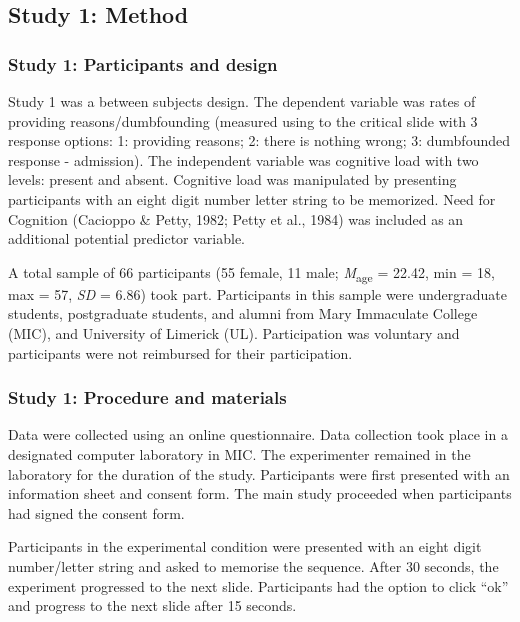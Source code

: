 \documentclass[
  american,
  man,floatsintext]{apa7}
\begin{document}
\hypertarget{study-1-method}{%
\subsection{Study 1: Method}\label{study-1-method}}

\hypertarget{study-1-participants-and-design}{%
\subsubsection{Study 1: Participants and design}\label{study-1-participants-and-design}}

Study 1 was a between subjects design. The dependent variable was rates of providing reasons/dumbfounding (measured using to the critical slide with 3 response options: 1: providing reasons; 2: there is nothing wrong; 3: dumbfounded response - admission). The independent variable was cognitive load with two levels: present and absent. Cognitive load was manipulated by presenting participants with an eight digit number letter string to be memorized. Need for Cognition (Cacioppo \& Petty, 1982; Petty et al., 1984) was included as an additional potential predictor variable.

A total sample of 66 participants (55 female, 11 male; \emph{M}\textsubscript{age} = 22.42, min = 18, max = 57, \emph{SD} = 6.86) took part. Participants in this sample were undergraduate students, postgraduate students, and alumni from Mary Immaculate College (MIC), and University of Limerick (UL). Participation was voluntary and participants were not reimbursed for their participation.

\hypertarget{study-1-procedure-and-materials}{%
\subsubsection{Study 1: Procedure and materials}\label{study-1-procedure-and-materials}}

Data were collected using an online questionnaire. Data collection took place in a designated computer laboratory in MIC. The experimenter remained in the laboratory for the duration of the study. Participants were first presented with an information sheet and consent form. The main study proceeded when participants had signed the consent form.

Participants in the experimental condition were presented with an eight digit number/letter string and asked to memorise the sequence. After 30 seconds, the experiment progressed to the next slide. Participants had the option to click ``ok'' and progress to the next slide after 15 seconds.
\end{document}
